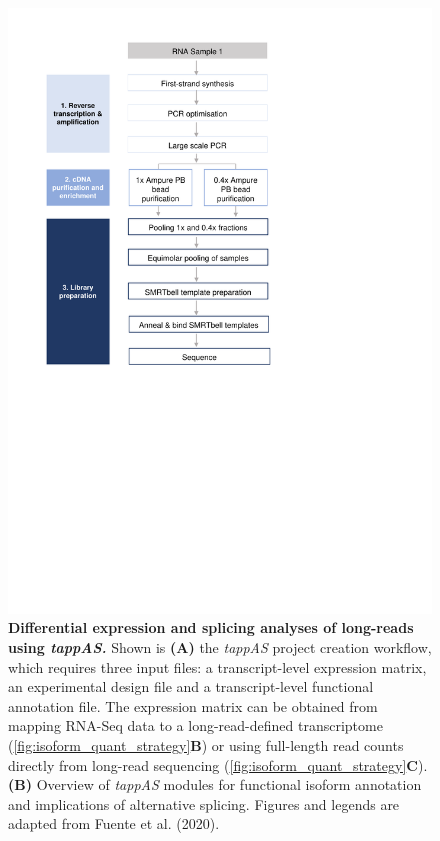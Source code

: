 \begin{figure}[htp]
	\begin{center}
		\includegraphics[page=21,trim={0cm 5cm 0 0cm},clip, scale = 0.8]{Figures/ProjectDevelopment_Figures.pdf}
	\end{center}
	\captionsetup{width=0.95\textwidth,singlelinecheck=off}
	\caption[Differential expression and splicing analyses of long-reads using \textit{tappAS}]%
	{\textbf{Differential expression and splicing analyses of long-reads using \textit{tappAS.}} Shown is \textbf{(A)} the \textit{tappAS} project creation workflow, which requires three input files: a transcript-level expression matrix, an experimental design file and a transcript-level functional annotation file. The expression matrix can be obtained from mapping RNA-Seq data to a long-read-defined transcriptome (\cref{fig:isoform_quant_strategy}\textbf{B}) or using full-length read counts directly from long-read sequencing (\cref{fig:isoform_quant_strategy}\textbf{C}). \textbf{(B)} Overview of \textit{tappAS} modules for functional isoform annotation and implications of alternative splicing. Figures and legends are adapted from Fuente et al. (2020)\cite{DeLaFuente2020}.
	}
	\label{fig:tappAS_overview}
\end{figure}

